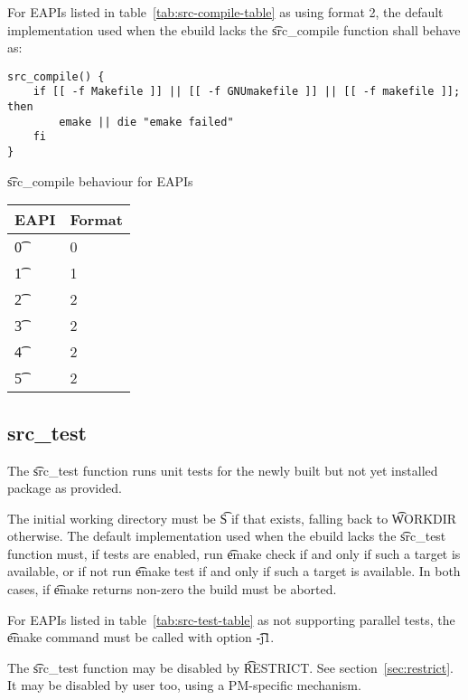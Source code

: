  For EAPIs listed in table~\ref{tab:src-compile-table} as using format
2, the default implementation used when the ebuild lacks the \t{src\_compile} function shall behave
as:

\begin{verbatim}
src_compile() {
    if [[ -f Makefile ]] || [[ -f GNUmakefile ]] || [[ -f makefile ]]; then
        emake || die "emake failed"
    fi
}
\end{verbatim}

\begin{centertable}{\t{src\_compile} behaviour for EAPIs} \label{tab:src-compile-table}
    \begin{tabular}{ l l }
        \toprule
        \multicolumn{1}{c}{\textbf{EAPI}} &
        \multicolumn{1}{c}{\textbf{Format}} \\
        \midrule
    \t{0} & 0 \\
    \t{1} & 1 \\
    \t{2} & 2 \\
    \t{3} & 2 \\
    \t{4} & 2 \\
    \t{5} & 2 \\
    \bottomrule
    \end{tabular}
\end{centertable}

\subsection{src\_test}
\label{sec:src-test-function}

The \t{src\_test} function runs unit tests for the newly built but not yet installed package as
provided.

The initial working directory must be \t{S} if that exists, falling back to \t{WORKDIR} otherwise.
The default implementation used when the ebuild lacks the \t{src\_test} function must, if tests are
enabled, run \t{emake check} if and only if such a target is available, or if not run
\t{emake test} if and only if such a target is available. In both cases, if \t{emake} returns
non-zero the build must be aborted.

 For EAPIs listed in table~\ref{tab:src-test-table} as not supporting
parallel tests, the \t{emake} command must be called with option \t{-j1}.

The \t{src\_test} function may be disabled by \t{RESTRICT}\@. See section~\ref{sec:restrict}. It may
be disabled by user too, using a PM-specific mechanism.


